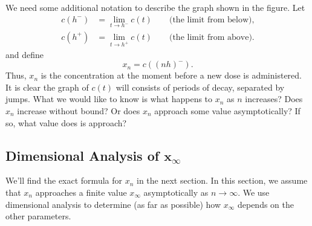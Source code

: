 \documentclass[reqno]{immbook}
\numberwithin{equation}{chapter}
\numberwithin{question}{section}
\numberwithin{theorem}{chapter}
\numberwithin{figure}{chapter}
\theoremstyle{definition}
\begin{document}
We need some additional notation to describe the
graph shown in the figure.
Let
\begin{equation}
\begin{split}
    c(h^{-})  & = \lim_{t\rightarrow h^{-}} c(t)
                     \quad\quad \textrm{(the limit from below),} \\
    c(h^{+})  & = \lim_{t\rightarrow h^{+}} c(t)
                     \quad\quad \textrm{(the limit from above).}
\end{split}
\end{equation}
and define
\begin{equation}
   x_n = c((nh)^{-}).
\end{equation}
Thus, $x_n$ is the concentration at the moment before
a new dose is administered.
It is clear the graph of $c(t)$ will consists of
periods of decay, separated by jumps.  What we would like to
know is what happens to $x_n$ as $n$ increases?
Does $x_n$ increase without bound? Or does $x_n$ approach
some value asymptotically?  If so, what value does is approach?

\subsection*{Dimensional Analysis of $\pmb{x_{\infty}}$}
We'll find the exact formula for $x_n$ in the next section.
In this section, we
assume that $x_n$ approaches a finite value $x_{\infty}$
asymptotically as $n\rightarrow\infty$.
We use dimensional analysis to determine
(as far as possible) how $x_{\infty}$
depends on the other parameters.
\end{document}
